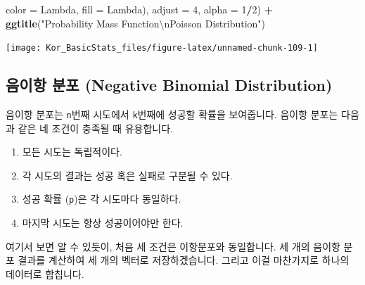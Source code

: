 \documentclass[]{book}
\newenvironment{Shaded}{\begin{snugshade}}{\end{snugshade}}
\newcommand{\CharTok}[1]{\textcolor[rgb]{0.31,0.60,0.02}{#1}}
\newcommand{\DataTypeTok}[1]{\textcolor[rgb]{0.13,0.29,0.53}{#1}}
\newcommand{\DecValTok}[1]{\textcolor[rgb]{0.00,0.00,0.81}{#1}}
\newcommand{\KeywordTok}[1]{\textcolor[rgb]{0.13,0.29,0.53}{\textbf{#1}}}
\newcommand{\NormalTok}[1]{#1}
\newcommand{\OperatorTok}[1]{\textcolor[rgb]{0.81,0.36,0.00}{\textbf{#1}}}
\newcommand{\StringTok}[1]{\textcolor[rgb]{0.31,0.60,0.02}{#1}}
\providecommand{\tightlist}{%
  \setlength{\itemsep}{0pt}\setlength{\parskip}{0pt}}
\begin{document}
\begin{Shaded}
\begin{Highlighting}[]
      \DataTypeTok{color =}\NormalTok{ Lambda, }
                   \DataTypeTok{fill =}\NormalTok{ Lambda), }
               \DataTypeTok{adjust =} \DecValTok{4}\NormalTok{, }\DataTypeTok{alpha =} \DecValTok{1}\OperatorTok{/}\DecValTok{2}\NormalTok{) }\OperatorTok{+}
\StringTok{  }\KeywordTok{ggtitle}\NormalTok{(}\StringTok{"Probability Mass Function}\CharTok{\textbackslash{}n}\StringTok{Poisson Distribution"}\NormalTok{)}
\end{Highlighting}
\end{Shaded}

\begin{center}\texttt{[image: Kor\_BasicStats\_files/figure-latex/unnamed-chunk-109-1]} \end{center}

\hypertarget{uxc74cuxc774uxd56d-uxbd84uxd3ec-negative-binomial-distribution}{%
\subsection{음이항 분포 (Negative Binomial Distribution)}\label{uxc74cuxc774uxd56d-uxbd84uxd3ec-negative-binomial-distribution}}

음이항 분포는 \texttt{n}번째 시도에서 \texttt{k}번째에 성공할 확률을 보여줍니다. 음이항 분포는 다음과 같은 네 조건이 충족될 때 유용합니다.

\begin{enumerate}
\def\labelenumi{\arabic{enumi}.}
\tightlist
\item
  모든 시도는 독립적이다.
\item
  각 시도의 결과는 성공 혹은 실패로 구분될 수 있다.
\item
  성공 확률 (\texttt{p})은 각 시도마다 동일하다.
\item
  마지막 시도는 항상 성공이어야만 한다.
\end{enumerate}

여기서 보면 알 수 있듯이, 처음 세 조건은 이항분포와 동일합니다. 세 개의 음이항 분포 결과를 계산하여 세 개의 벡터로 저장하겠습니다. 그리고 이걸 마찬가지로 하나의 데이터로 합칩니다.
\end{document}
